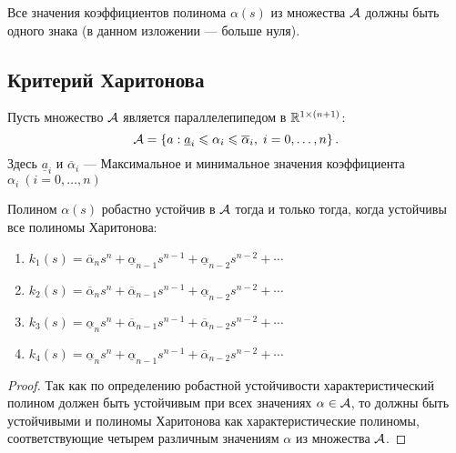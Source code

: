 \documentclass[../../TAU.tex]{subfiles}
\begin{document}
    \begin{theor}
        Все значения коэффициентов полинома $\alpha(s)$ из множества $\mathcal{A}$ должны быть одного знака (в данном изложении --- больше нуля).
    \end{theor}

\subsection{Критерий Харитонова}

    Пусть множество $\mathcal{A}$ является параллелепипедом в $\mathbb{R}^{1\times (n+1)}$:
    $$
        \mathcal{A}=\left\{a: \underline{ a}_i\leqslant \alpha_i \leqslant \overline \alpha_i, \; i=0,\ldots,n\right\}.
    $$
    Здесь $\underline{a}_i$ и $\overline \alpha_i$ ---
    Максимальное и минимальное значения коэффициента $\alpha_i\ (i=0,\dots,n)$

    \begin{theor}
        Полином $\alpha(s)$ робастно устойчив в $\mathcal{A}$ тогда и только тогда, когда устойчивы все полиномы Харитонова:
        \begin{enumerate}
            \item 
                $k_1(s) = \overline{\alpha}_n s^n + \underline{\alpha}_{n-1} s^{n-1} + \underline{\alpha}_{n-2} s^{n-2} + \cdots$
            \item 
                $k_2(s) = \overline \alpha_n s^n + \overline \alpha_{n-1} s^{n-1} + \underline{\alpha}_{n-2} s^{n-2} + \cdots$
            \item 
                $k_3(s) = \underline{\alpha}_n s^n + \overline \alpha_{n-1} s^{n-1} + \overline \alpha_{n-2} s^{n-2} + \cdots$
            \item 
                $k_4(s) = \underline{\alpha}_n s^n + \underline{\alpha}_{n-1} s^{n-1} + \overline \alpha_{n-2} s^{n-2} + \cdots$
        \end{enumerate}

    \end{theor}

    \begin{proof}
        Так как по определению робастной устойчивости характеристический полином должен быть устойчивым при всех значениях $\alpha \in \mathcal{A}$, то должны быть устойчивыми и полиномы Харитонова как характеристические полиномы, соответствующие четырем различным значениям $\alpha$ из множества $\mathcal{A}$.
    \end{proof}
\end{document}
